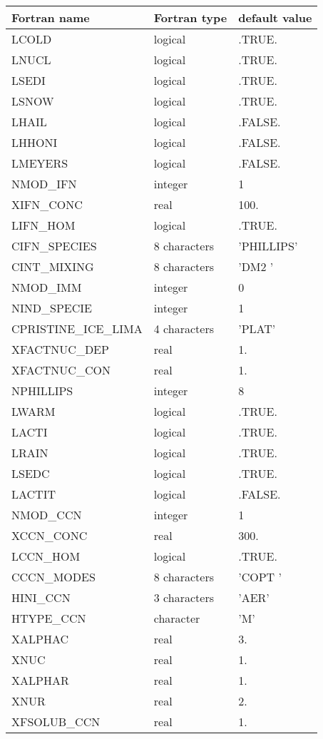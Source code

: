 \begin{center}
\begin{tabular} {|l|l|l|}
\hline
Fortran name & Fortran type & default value \\
\hline
LCOLD         &  logical     & .TRUE. \\
LNUCL & logical	  &  .TRUE. \\
LSEDI &  logical&  .TRUE. \\
LSNOW & logical  &  .TRUE.\\
LHAIL &  logical& .FALSE. \\
LHHONI & logical &  .FALSE.\\
LMEYERS & logical   & .FALSE. \\
NMOD\_IFN & integer   & 1  \\
XIFN\_CONC & real & 100.  \\
LIFN\_HOM & logical & .TRUE.  \\
CIFN\_SPECIES & 8 characters   & 'PHILLIPS' \\
CINT\_MIXING &8 characters  & 'DM2     ' \\
NMOD\_IMM & integer &0  \\
NIND\_SPECIE & integer & 1 \\
CPRISTINE\_ICE\_LIMA & 4 characters &  'PLAT' \\
XFACTNUC\_DEP & real  & 1. \\
XFACTNUC\_CON & real & 1. \\
NPHILLIPS & integer  & 8 \\
LWARM & logical  & .TRUE. \\
LACTI& logical  & .TRUE. \\
LRAIN& logical  & .TRUE. \\
LSEDC& logical  & .TRUE. \\
LACTIT& logical  & .FALSE. \\
NMOD\_CCN & integer   & 1  \\
XCCN\_CONC & real & 300.  \\
LCCN\_HOM & logical & .TRUE.  \\
CCCN\_MODES &  8 characters & 'COPT    '  \\
HINI\_CCN & 3 characters  & 'AER' \\
HTYPE\_CCN & character & 'M'  \\
XALPHAC & real & 3.  \\
XNUC & real  & 1.  \\
XALPHAR &  real& 1. \\
XNUR & real  & 2. \\
XFSOLUB\_CCN & real & 1.  \\

\end{tabular}
\end{center}
